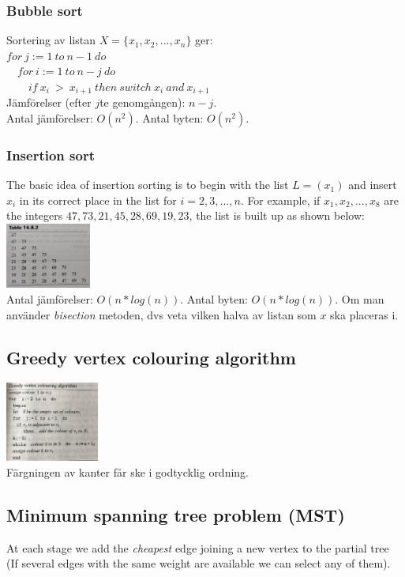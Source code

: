 \documentclass{article}
\begin{document}
\begin{multicols}{2}
\subsubsection{Bubble sort}
Sortering av listan $X = \{x_1,x_2,...,x_n\}$ ger:\\
$for \ j:=1 \ to \ n-1 \ do$\\
$\quad for \ i:=1 \ to \ n-j \ do$\\
$\quad \quad if \ x_i \ > \ x_{i+1} \ then \ switch \ x_i \ and \ x_{i+1}$\\
\newline
Jämförelser (efter $j$te genomgången): $n-j$.\\
Antal jämförelser: $O(n^2)$. Antal byten: $O(n^2)$. 

\subsubsection{Insertion sort}
The basic idea of insertion sorting is to begin with the list $L=(x_1)$ and insert $x_i$ in its correct place in the list for $i =2,3,...,n$. For example, if $x_1,x_2,...,x_8$ are the integers $47,73,21,45,28,69,19,23$, the list is built up as shown below:\\
\includegraphics[width=0.21\textwidth]{images/insertion}\\
Antal jämförelser: $O(n*log(n))$. Antal byten: $O(n*log(n))$. Om man använder \textit{bisection} metoden, dvs veta vilken halva av listan som $x$ ska placeras i.

\subsection{Greedy vertex colouring algorithm}
\includegraphics[width=0.23\textwidth]{images/color_alg}\\
Färgningen av kanter får ske i godtycklig ordning.

\subsection{Minimum spanning tree problem (MST)}
At each stage we add the \textit{cheapest} edge joining a new vertex to the partial tree (If several edges with the same weight are available we can select any of them).


\end{multicols}
\end{document}

